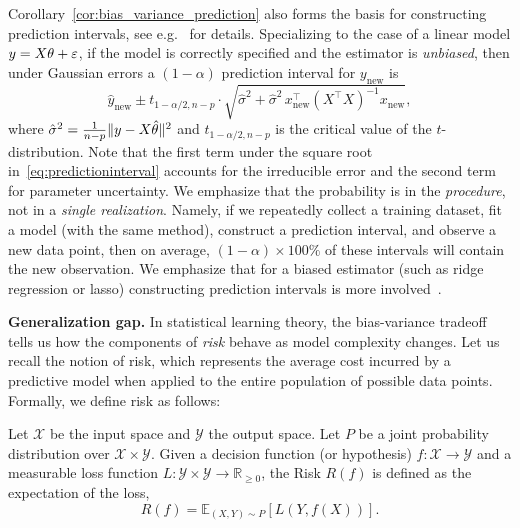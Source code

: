 \medskip



Corollary~\ref{cor:bias_variance_prediction} also forms the basis for constructing prediction intervals, see e.g.~\cite{seber2003linear,hastieelements} for  details. Specializing to the case of a linear model $y = X\theta + \varepsilon$, if the model is correctly specified and the estimator is {\em unbiased}, then
under Gaussian errors a $(1-\alpha)$ prediction interval for $y_{\text{new}}$ is
\begin{equation}\label{eq:predictioninterval}   \hat{y}_{\text{new}} \pm t_{1-\alpha/2, n-p} \cdot \sqrt{\hat{\sigma}^2 + \hat{\sigma}^2 \, x_{\text{new}}^\top(X^\top X)^{-1}x_{\text{new}}},
\end{equation}
where $\hat{\sigma}^2 = \frac{1}{n-p}\|y - X\hat{\theta}\|^2$ and $t_{1-\alpha/2, n-p}$ is the critical value of the $t$-distribution.
Note that the first term under the square root
in~\eqref{eq:predictioninterval} accounts for
the irreducible error and the second term for parameter uncertainty.
We emphasize that the probability is in the
{\em procedure}, not in a {\em single realization}. Namely, if we repeatedly collect a training dataset, fit a model (with the same method), construct a prediction interval, and
observe a new data point, then on average, 
$(1-\alpha) \times 100\%$ of these intervals will contain the new observation. 
We emphasize that for a biased estimator (such as ridge regression or lasso) constructing prediction intervals is more involved~\cite{efron1994introduction,hastieelements}.

\medskip
\noindent
\textbf{Generalization gap.}
In statistical learning theory, the bias-variance tradeoff tells us how the components of {\em risk} behave as model complexity changes. Let us recall the notion of  risk, which represents the average cost incurred by a predictive model when applied to the entire population of possible data points. Formally, we define risk as follows:
\begin{definition}\label{de:risk}
Let $\mathcal{X}$ be the input space and $\mathcal{Y}$ the output space. Let $P$ be a joint probability distribution over $\mathcal{X} \times \mathcal{Y}$. Given a decision function (or hypothesis) $f: \mathcal{X} \to \mathcal{Y}$ and a measurable loss function $L: \mathcal{Y} \times \mathcal{Y} \to \mathbb{R}_{\geq 0}$, the Risk $R(f)$ is defined as the expectation of the loss,
$$R(f) = \mathbb{E}_{(X, Y) \sim P} [L(Y, f(X))].$$
\end{definition}


